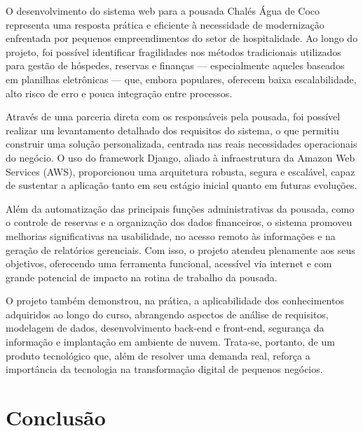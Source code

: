 \documentclass[
	12pt,				%
	openany,			%
	oneside,			%
	a4paper,			%
	english,			%
	french,				%
	spanish,			%
	brazil				%
	]{abntex2}
\begin{document}
O desenvolvimento do sistema web para a pousada Chalés Água de Coco representa uma resposta prática e eficiente à necessidade de modernização enfrentada por pequenos empreendimentos do setor de hospitalidade. Ao longo do projeto, foi possível identificar fragilidades nos métodos tradicionais utilizados para gestão de hóspedes, reservas e finanças — especialmente aqueles baseados em planilhas eletrônicas — que, embora populares, oferecem baixa escalabilidade, alto risco de erro e pouca integração entre processos.

Através de uma parceria direta com os responsáveis pela pousada, foi possível realizar um levantamento detalhado dos requisitos do sistema, o que permitiu construir uma solução personalizada, centrada nas reais necessidades operacionais do negócio. O uso do framework Django, aliado à infraestrutura da Amazon Web Services (AWS), proporcionou uma arquitetura robusta, segura e escalável, capaz de sustentar a aplicação tanto em seu estágio inicial quanto em futuras evoluções.

Além da automatização das principais funções administrativas da pousada, como o controle de reservas e a organização dos dados financeiros, o sistema promoveu melhorias significativas na usabilidade, no acesso remoto às informações e na geração de relatórios gerenciais. Com isso, o projeto atendeu plenamente aos seus objetivos, oferecendo uma ferramenta funcional, acessível via internet e com grande potencial de impacto na rotina de trabalho da pousada.

O projeto também demonstrou, na prática, a aplicabilidade dos conhecimentos adquiridos ao longo do curso, abrangendo aspectos de análise de requisitos, modelagem de dados, desenvolvimento back-end e front-end, segurança da informação e implantação em ambiente de nuvem. Trata-se, portanto, de um produto tecnológico que, além de resolver uma demanda real, reforça a importância da tecnologia na transformação digital de pequenos negócios.


%

\chapter{Conclusão}
\end{document}
